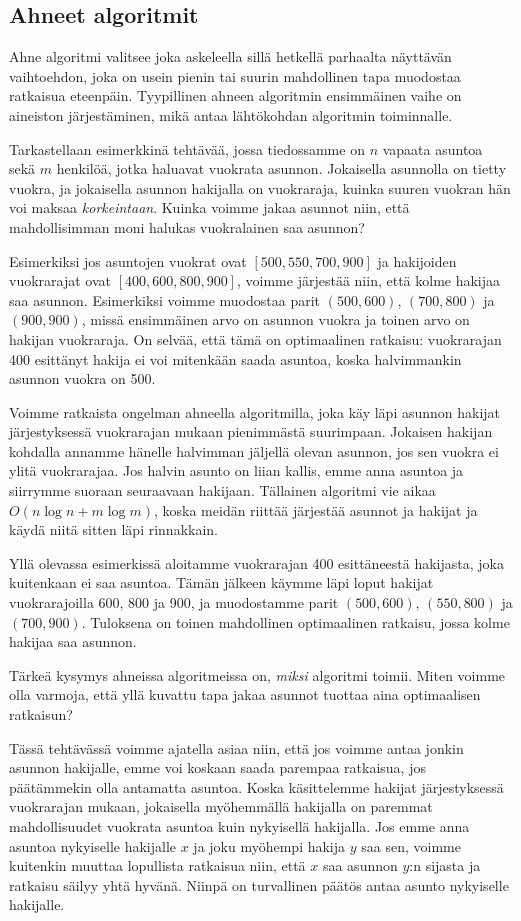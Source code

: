 \subsection{Ahneet algoritmit}

Ahne algoritmi valitsee joka askeleella sillä hetkellä parhaalta
näyttävän vaihtoehdon, joka on usein pienin tai suurin mahdollinen
tapa muodostaa ratkaisua eteenpäin.
Tyypillinen ahneen algoritmin ensimmäinen vaihe on aineiston
järjestäminen, mikä antaa lähtökohdan algoritmin toiminnalle.

Tarkastellaan esimerkkinä tehtävää, jossa tiedossamme on
$n$ vapaata asuntoa sekä $m$ henkilöä, jotka haluavat vuokrata asunnon.
Jokaisella asunnolla on tietty vuokra,
ja jokaisella asunnon hakijalla on vuokraraja,
kuinka suuren vuokran hän voi maksaa \emph{korkeintaan}.
Kuinka voimme jakaa asunnot niin, että mahdollisimman moni
halukas vuokralainen saa asunnon?

Esimerkiksi jos asuntojen vuokrat ovat $[500,550,700,900]$
ja hakijoiden vuokrarajat ovat $[400,600,800,900]$,
voimme järjestää niin, että kolme hakijaa saa asunnon.
Esimerkiksi voimme muodostaa parit $(500,600)$, $(700,800)$
ja $(900,900)$, missä ensimmäinen arvo on asunnon vuokra
ja toinen arvo on hakijan vuokraraja.
On selvää, että tämä on optimaalinen ratkaisu:
vuokrarajan 400 esittänyt hakija ei voi mitenkään saada asuntoa,
koska halvimmankin asunnon vuokra on 500.

Voimme ratkaista ongelman ahneella algoritmilla,
joka käy läpi asunnon hakijat järjestyksessä vuokrarajan
mukaan pienimmästä suurimpaan.
Jokaisen hakijan kohdalla annamme hänelle halvimman
jäljellä olevan asunnon, jos sen vuokra ei ylitä vuokrarajaa.
Jos halvin asunto on liian kallis, emme anna asuntoa ja
siirrymme suoraan seuraavaan hakijaan.
Tällainen algoritmi vie aikaa $O(n \log n + m \log m)$,
koska meidän riittää järjestää asunnot ja hakijat
ja käydä niitä sitten läpi rinnakkain.

Yllä olevassa esimerkissä aloitamme vuokrarajan 400
esittäneestä hakijasta, joka kuitenkaan ei saa asuntoa.
Tämän jälkeen käymme läpi loput hakijat
vuokrarajoilla 600, 800 ja 900, ja muodostamme parit
$(500,600)$, $(550,800)$ ja $(700,900)$.
Tuloksena on toinen mahdollinen optimaalinen ratkaisu,
jossa kolme hakijaa saa asunnon.

Tärkeä kysymys ahneissa algoritmeissa on, \emph{miksi}
algoritmi toimii. Miten voimme olla varmoja, että yllä kuvattu tapa
jakaa asunnot tuottaa aina optimaalisen ratkaisun?

Tässä tehtävässä voimme ajatella asiaa niin,
että jos voimme antaa jonkin asunnon hakijalle,
emme voi koskaan saada parempaa ratkaisua,
jos päätämmekin olla antamatta asuntoa.
Koska käsittelemme hakijat järjestyk\-sessä vuokrarajan mukaan,
jokaisella myöhemmällä hakijalla on paremmat mahdollisuudet
vuokrata asuntoa kuin nykyisellä hakijalla.
Jos emme anna asuntoa nykyiselle hakijalle $x$
ja joku myöhempi hakija $y$ saa sen, voimme kuitenkin 
muuttaa lopullista ratkaisua niin, että $x$
saa asunnon $y$:n sijasta ja ratkaisu säilyy yhtä hyvänä.
Niinpä on turvallinen päätös antaa asunto nykyiselle hakijalle.